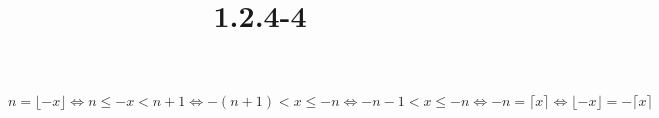 \documentclass{article}
\title{1.2.4-4}
\begin{document}
\maketitle

\( n = \lfloor -x \rfloor \iff n \leq -x < n + 1 \iff -(n+1) < x \leq -n \iff -n-1 < x \leq -n \iff -n = \lceil x \rceil \iff \lfloor -x \rfloor = - \lceil x \rceil \)
\end{document}
